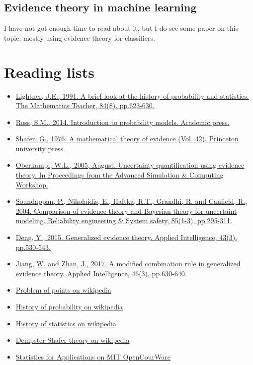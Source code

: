 \documentclass[11pt]{article}
\begin{document}
\subsection{Evidence theory in machine learning}
\label{sec:orga84257b}
I have not got enough time to read about it, but I do see some paper on this topic, mostly using evidence theory for classifiers.

\section{Reading lists}
\label{sec:orgd3ab461}
\begin{itemize}
\item \href{http://www.jstor.org/stable/pdf/27967334.pdf?refreqid=excelsior\%253A8eea78ccaa3fd539bb77e2b2345460d7}{Lightner, J.E., 1991. A brief look at the history of probability and
statistics. The Mathematics Teacher, 84(8), pp.623-630.}
\item \href{http://dspace.elib.ntt.edu.vn/dspace/bitstream/123456789/8106/1/Introduction\%2520to\%2520Probability\%2520Models.pdf}{Ross, S.M., 2014. Introduction to probability models. Academic press.}
\item \href{https://libgen.pw/download/book/5a1f052a3a044650f50c7b6b}{Shafer, G., 1976. A mathematical theory of evidence (Vol. 42). Princeton
university press.}
\item \href{https://web.stanford.edu/group/cits/pdf/lectures/oberkampf.pdf}{Oberkampf, W.L., 2005, August. Uncertainty quantification using evidence
theory. In Proceedings from the Advanced Simulation \& Computing Workshop.}
\item \href{https://www.sciencedirect.com/science/article/pii/S0951832004000675}{Soundappan, P., Nikolaidis, E., Haftka, R.T., Grandhi, R. and Canfield,
R., 2004. Comparison of evidence theory and Bayesian theory for uncertaint
modeling. Reliability engineering \& System safety, 85(1-3), pp.295-311.}
\item \href{https://link.springer.com/article/10.1007/s10489-015-0661-2}{Deng, Y., 2015. Generalized evidence theory. Applied Intelligence, 43(3),
pp.530-543.}
\item \href{https://link.springer.com/article/10.1007/s10489-016-0851-6}{Jiang, W. and Zhan, J., 2017. A modified combination rule in generalized
evidence theory. Applied Intelligence, 46(3), pp.630-640.}
\item \href{https://en.wikipedia.org/wiki/Problem\_of\_points}{Problem of points on wikipedia}
\item \href{https://en.wikipedia.org/wiki/History\_of\_probability}{History of probability on wikipedia}
\item \href{https://en.wikipedia.org/wiki/History\_of\_statistics}{History of statistics on wikipedia}
\item \href{https://en.wikipedia.org/wiki/Dempster\%25E2\%2580\%2593Shafer\_theory}{Dempster-Shafer theory on wikipedia}
\item \href{https://ocw.mit.edu/courses/mathematics/18-650-statistics-for-applications-fall-2016/}{Statistics for Applications on MIT OpenCourWare}
\end{itemize}
\end{document}
